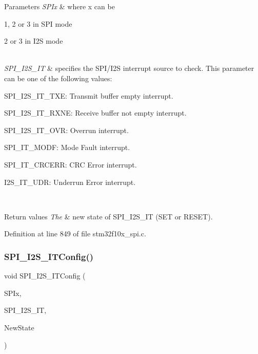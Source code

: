 \begin{DoxyParams}{Parameters}
{\em S\+P\+Ix} & where x can be
\begin{DoxyItemize}
\item 1, 2 or 3 in S\+PI mode
\item 2 or 3 in I2S mode 
\end{DoxyItemize}\\
\hline
{\em S\+P\+I\+\_\+\+I2\+S\+\_\+\+IT} & specifies the S\+P\+I/\+I2S interrupt source to check. This parameter can be one of the following values\+: \begin{DoxyItemize}
\item S\+P\+I\+\_\+\+I2\+S\+\_\+\+I\+T\+\_\+\+T\+XE\+: Transmit buffer empty interrupt. \item S\+P\+I\+\_\+\+I2\+S\+\_\+\+I\+T\+\_\+\+R\+X\+NE\+: Receive buffer not empty interrupt. \item S\+P\+I\+\_\+\+I2\+S\+\_\+\+I\+T\+\_\+\+O\+VR\+: Overrun interrupt. \item S\+P\+I\+\_\+\+I\+T\+\_\+\+M\+O\+DF\+: Mode Fault interrupt. \item S\+P\+I\+\_\+\+I\+T\+\_\+\+C\+R\+C\+E\+RR\+: C\+RC Error interrupt. \item I2\+S\+\_\+\+I\+T\+\_\+\+U\+DR\+: Underrun Error interrupt. \end{DoxyItemize}
\\
\hline
\end{DoxyParams}

\begin{DoxyRetVals}{Return values}
{\em The} & new state of S\+P\+I\+\_\+\+I2\+S\+\_\+\+IT (S\+ET or R\+E\+S\+ET). \\
\hline
\end{DoxyRetVals}


Definition at line 849 of file stm32f10x\+\_\+spi.\+c.

\mbox{\label{group___s_p_i___exported___functions_ga17f4ef132e8ddbf94cb6b1688d181e41}} 
\subsubsection{\texorpdfstring{S\+P\+I\+\_\+\+I2\+S\+\_\+\+I\+T\+Config()}{SPI\_I2S\_ITConfig()}}
{\footnotesize\ttfamily void S\+P\+I\+\_\+\+I2\+S\+\_\+\+I\+T\+Config (\begin{DoxyParamCaption}\item[{\hyperlink{struct_s_p_i___type_def}{S\+P\+I\+\_\+\+Type\+Def} $\ast$}]{S\+P\+Ix,  }\item[{uint8\+\_\+t}]{S\+P\+I\+\_\+\+I2\+S\+\_\+\+IT,  }\item[{\hyperlink{group___exported__types_gac9a7e9a35d2513ec15c3b537aaa4fba1}{Functional\+State}}]{New\+State }\end{DoxyParamCaption})}



